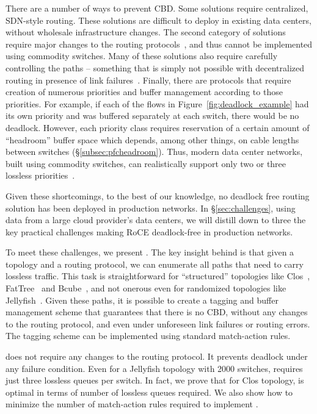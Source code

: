 There are a number of ways to prevent CBD.  Some solutions require centralized,
SDN-style routing.  These solutions are difficult to deploy in existing data
centers, without wholesale infrastructure changes.  The second category of
solutions require major changes to the routing protocols~\cite{tcpbolt}, and
thus cannot be implemented using commodity switches. Many of these solutions
also require carefully controlling the paths -- something that is simply not
possible with decentralized routing in presence of link
failures~\cite{netpilot}.  Finally, there are protocols that require creation of
numerous priorities and buffer management according to those priorities. For
example, if each of the flows in Figure~\ref{fig:deadlock_example} had its own
priority and was buffered separately at each switch, there would be no deadlock.
However, each priority class requires reservation of a certain amount of
``headroom'' buffer space which depends, among other things, on cable lengths
between switches (\S\ref{subsec:pfcheadroom}). Thus, modern data center
networks, built using commodity switches, can realistically support only two or
three lossless priorities~\cite{rdmaatscale}.

Given these shortcomings, to the best of our knowledge, no deadlock free routing
solution has been deployed in production networks. In \S\ref{sec:challenges},
using data from a large cloud provider's data centers, we will distill down to
three the key practical challenges making RoCE deadlock-free in production
networks.

To meet these challenges, we present \sysname{}. The key insight behind
\sysname{} is that given a topology and a routing protocol, we can enumerate all
paths that need to carry lossless traffic. This task is straightforward for
``structured'' topologies like Clos~\cite{clos}, FatTree~\cite{fattree} and
Bcube~\cite{bcube}, and not onerous even for randomized topologies like
Jellyfish~\cite{jellyfish}.  Given these paths, it is possible to create a
tagging and buffer management scheme that guarantees that there is no CBD,
without any changes to the routing protocol, and even under unforeseen link
failures or routing errors. The tagging scheme can be implemented using standard
match-action rules.

\sysname{} does not require any changes to the routing protocol. It prevents
deadlock under any failure condition. Even for a Jellyfish topology with 2000
switches, \sysname{} requires just three lossless queues per switch.  In fact,
we prove that for Clos topology,  \sysname{} is optimal in terms of number of
lossless queues required.  We also show how to minimize the number of
match-action rules required to implement \sysname{}.

